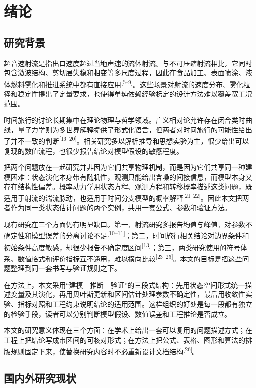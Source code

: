 \chapter{绪论}

\newcommand{\bibmark}[1]{\textsuperscript{[#1]}}

\section{研究背景}

超音速射流是指出口速度超过当地声速的流体射流。与不可压缩射流相比，它同时包含激波结构、剪切层失稳和相变等多尺度过程，因此在食品加工、表面喷涂、液体燃料雾化和推进系统中都有直接应用\bibmark{5--9}。这些场景对射流的速度分布、雾化粒径和稳定性提出了定量要求，也使得单纯依赖经验标定的设计方法难以覆盖宽工况范围。

时间旅行的讨论长期集中在理论物理与哲学领域。广义相对论允许存在闭合类时曲线，量子力学则为多世界解释提供了形式化语言，但两者对时间旅行的可能性给出了并不一致的判断\bibmark{16--20}。相关研究多以解析推导和思想实验为主，很少给出可以复现的数值流程，也很少报告结论对模型假设的敏感程度。

把两个问题放在一起研究并非因为它们共享物理机制，而是因为它们共享同一种建模困难：状态演化本身带有随机性，观测只能给出含噪的间接信息，而模型本身又存在结构性偏差。概率动力学用状态方程、观测方程和转移概率描述这类问题，既适用于射流的湍流脉动，也适用于时间分支模型的概率解释\bibmark{21--22}。因此本文把两者作为同一类状态估计问题的两个实例，共用一套公式、参数和验证方法。

现有研究在三个方面仍有明显缺口。第一，射流研究多报告均值与峰值，对参数不确定性和模型误差的分离讨论不足\bibmark{10--11}；第二，时间旅行相关结论对边界条件和初始条件高度敏感，却很少报告不确定度区间\bibmark{13}；第三，两类研究使用的符号体系、数值格式和评价指标互不通用，难以横向比较\bibmark{23--25}。本文的目标是把这些问题整理到同一套书写与验证规则之下。

在方法上，本文采用“建模—推断—验证”的三段式结构：先用状态空间形式统一描述变量及其演化，再用贝叶斯更新和区间估计处理参数不确定性，最后用收敛性实验、指标对照和工程约束说明结论的适用范围。这样组织的好处是每一段都有独立的检验手段，读者可以分别判断模型假设、数值误差和工程推论是否成立。

本文的研究意义体现在三个方面：在学术上给出一套可以复用的问题描述方式；在工程上把结论写成带区间的可核对形式；在方法上把公式、表格、图形和算法的排版规则固定下来，使替换研究内容时不必重新设计文档结构\bibmark{26}。

\section{国内外研究现状}

